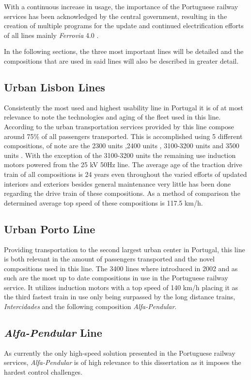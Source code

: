 With a continuous increase in usage, the importance of the Portuguese railway services has been acknowledged by the central government, resulting in the creation of multiple programs for the update and continued electrification efforts of all lines mainly \textit{Ferrovia} 4.0 \cite{ferrovia4}.

In the following sections, the three most important lines will be detailed and the compositions that are used in said lines will also be described in greater detail.

\subsection{Urban Lisbon Lines}
Consistently the most used and highest usability line in Portugal it is of at most relevance to note the technologies and aging of the fleet used in this line.
According to \cite{CP_accounting} the urban transportation services provided by this line compose around 75\% of all passengers transported. This is accomplished using 5 different compositions, of note are the 2300 units \cite{2300},2400 units \cite{2400}, 3100-3200 units \cite{3100-3200} and 3500 units \cite{3500}. With the exception of the 3100-3200 units the remaining use induction motors powered from the 25 kV  50Hz line. The average age of the traction drive train of all compositions is 24 years even throughout the varied efforts of updated interiors and exteriors besides general maintenance very little has been done regarding the drive train of these compositions. As a method of comparison the determined average top speed of these compositions is 117.5 km/h.

\subsection{Urban Porto Line}
Providing transportation to the second largest urban center in Portugal, this line is both relevant in the amount of passengers transported and the novel compositions used in this line. The 3400 lines \cite{3400} where introduced in 2002 and as such are the most up to date compositions in use in the Portuguese railway service. It utilizes induction motors with a top speed of 140 km/h placing it as the third fastest train in use only being surpassed by the long distance trains, \textit{Intercidades} and the following composition \textit{Alfa-Pendular}. 
\subsection{\textit{Alfa-Pendular} Line}
As currently the only high-speed solution presented in the Portuguese railway services, \textit{Alfa-Pendular} is of high relevance to this dissertation as it imposes the hardest control challenges.

